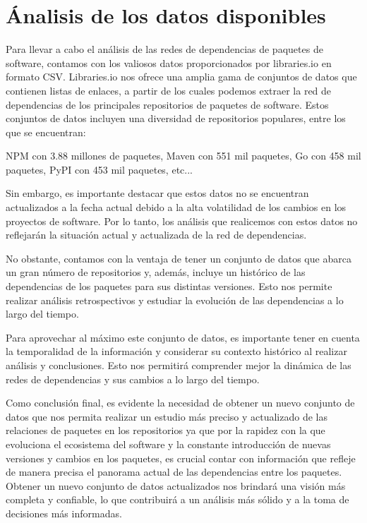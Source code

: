 
\section{Ánalisis de los datos disponibles}

Para llevar a cabo el análisis de las redes de dependencias de paquetes de software, contamos con los valiosos datos proporcionados por libraries.io en formato CSV. 
Libraries.io nos ofrece una amplia gama de conjuntos de datos que contienen listas de enlaces, a partir de los cuales podemos extraer la red de dependencias de los principales repositorios de paquetes de software. Estos conjuntos de datos incluyen una diversidad de repositorios populares, entre los que se encuentran:

NPM con 3.88 millones de paquetes, Maven con 551 mil paquetes, Go con 458 mil paquetes, PyPI con 453 mil paquetes, etc...

Sin embargo, es importante destacar que estos datos no se encuentran actualizados a la fecha actual debido a la alta volatilidad de los cambios en los proyectos de software. Por lo tanto, los análisis que realicemos con estos datos no reflejarán la situación actual y actualizada de la red de dependencias.

No obstante, contamos con la ventaja de tener un conjunto de datos que abarca un gran número de repositorios y, además, incluye un histórico de las dependencias de los paquetes para sus distintas versiones. Esto nos permite realizar análisis retrospectivos y estudiar la evolución de las dependencias a lo largo del tiempo.

Para aprovechar al máximo este conjunto de datos, es importante tener en cuenta la temporalidad de la información y considerar su contexto histórico al realizar análisis y conclusiones. Esto nos permitirá comprender mejor la dinámica de las redes de dependencias y sus cambios a lo largo del tiempo.

Como conclusión final, es evidente la necesidad de obtener un nuevo conjunto de datos que nos permita realizar un estudio más preciso y actualizado de las relaciones de paquetes en los repositorios ya que por la rapidez con la que evoluciona el ecosistema del software y la constante introducción de nuevas versiones y cambios en los paquetes, es crucial contar con información que refleje de manera precisa el panorama actual de las dependencias entre los paquetes. 
Obtener un nuevo conjunto de datos actualizados nos brindará una visión más completa y confiable, lo que contribuirá a un análisis más sólido y a la toma de decisiones más informadas.


